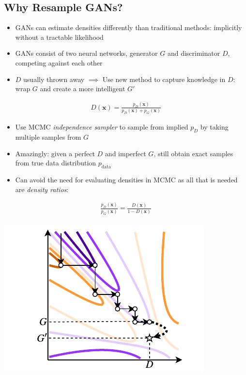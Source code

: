 \documentclass[a0,landscape]{a0poster}
\newcommand{\mysection}[1]{\section*{\fontsize{67.1}{82} \selectfont \color{NavyBlue} #1 \color{Black}}}
\renewcommand{\vec}[1]{{\boldsymbol{\mathbf{#1}}}} %
\newcommand{\PG}{{p_G}}
\newcommand{\PD}{{p_D}}
\newcommand{\PR}{{p_{\textrm{data}}}}
\begin{document}
\begin{multicols}{3} %


\Large

\mysection{Why Resample GANs?}

\begin{itemize}
  \item GANs can estimate densities differently than traditional methods: implicitly without a tractable likelihood
  \item GANs consist of two neural networks, generator $G$ and discriminator $D$, competing against each other
  \item $D$ usually thrown away $\implies$ Use new method to capture knowledge in $D$: wrap $G$ and create a more intelligent $G'$
\end{itemize}
%
\begin{align}
  D(\vec x) = \frac{\PD(\vec x)}{\PD(\vec x) + \PG(\vec x)}
\end{align}
%
\begin{itemize}
  \item Use MCMC \emph{independence sampler} to sample from implied $\PD$ by taking multiple samples from $G$
  \item Amazingly: given a perfect $D$ and imperfect $G$, still obtain exact samples from true data distribution $\PR$
  \item Can avoid the need for evaluating densities in MCMC as all that is needed are \emph{density ratios}:
\end{itemize}
%
\begin{align}
  \frac{\PD(\vec x)}{\PG(\vec x)} = \frac{D(\vec x)}{1 - D(\vec x)}
\end{align}
%
~\\
\includegraphics[scale=2.75]{../figures/coord_descent.pdf}

\end{multicols}
\end{document}

